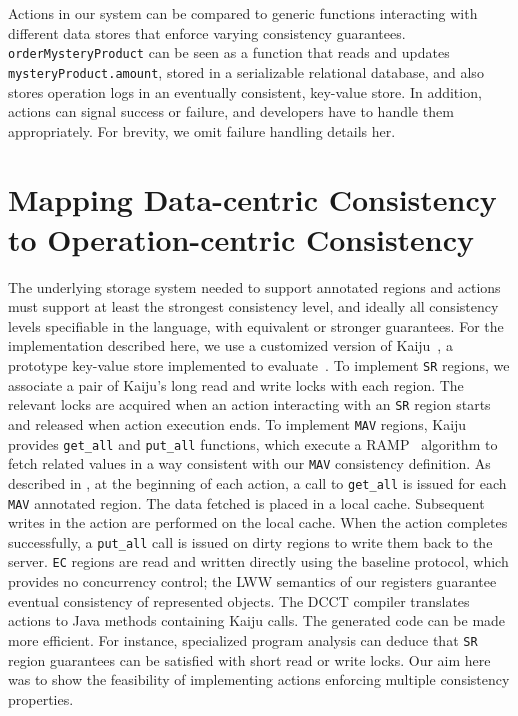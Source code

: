 \documentclass[numbers]{sigplanconf}
\begin{document}
Actions in our system can be compared to generic functions interacting
with different data stores that enforce varying consistency guarantees.
\texttt{orderMysteryProduct} can be seen as a function that
reads and updates \texttt{mysteryProduct.amount}, stored in a
serializable relational database, and also stores operation logs in an eventually consistent,
key-value store. In addition, actions can signal success
or failure, and developers have to handle them appropriately. For brevity, we
omit failure handling details her.

\section{Mapping Data-centric Consistency to Operation-centric Consistency}
\label{sec:underlyingsys}
The underlying storage system needed to support annotated regions and actions must
support at least the strongest consistency level, and ideally all consistency
levels specifiable in the language, with equivalent or stronger
guarantees. For the implementation described here, we use a customized
version of Kaiju~\cite{kaiju}, a prototype key-value store implemented to
evaluate~\cite{bailis2014scalable}. To implement \texttt{SR} regions, we
associate a pair of Kaiju's long read and write locks with each region. 
The relevant locks are acquired when an action interacting with an \texttt{SR}
region starts and released when action execution ends. 
To implement \texttt{MAV} regions, Kaiju provides
\texttt{get\_all} and \texttt{put\_all} functions, which execute a
RAMP~\cite{bailis2014scalable} algorithm
to fetch related values in a way consistent with our \texttt{MAV} consistency
definition. As described in \cite{bailis2014scalable}, at the beginning of
each action, a call to
\texttt{get\_all} is issued for each \texttt{MAV} annotated region.
The data fetched
is placed in a local cache. Subsequent writes in the action are performed on
the local cache. When the action completes successfully, a %
\texttt{put\_all} call is issued on dirty regions to write them back to the server. 
%
\texttt{EC} regions are read and written directly using the baseline protocol, 
which provides no concurrency control; the LWW semantics of our registers guarantee
eventual consistency of represented objects. 
The DCCT compiler translates actions to Java methods containing Kaiju calls.
The generated code can be made more efficient. For instance, specialized 
program analysis can deduce that  \texttt{SR}  region guarantees can be satisfied 
with short read or write locks. Our aim here
was to show the feasibility of implementing actions enforcing multiple
consistency properties.
\end{document}
